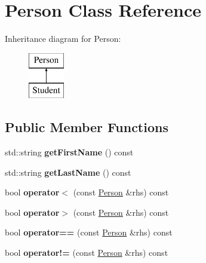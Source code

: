 \hypertarget{class_person}{}\section{Person Class Reference}
\label{class_person}
Inheritance diagram for Person\+:\begin{figure}[H]
\begin{center}
\leavevmode
\includegraphics[height=2.000000cm]{class_person}
\end{center}
\end{figure}
\subsection*{Public Member Functions}
\begin{DoxyCompactItemize}
\item 
\mbox{\label{class_person_a4a336bacf7dbe9b9227592d0896bcc1c}} 
std\+::string {\bfseries get\+First\+Name} () const
\item 
\mbox{\label{class_person_a8e8962e308c9c513ff676fd0b30c4926}} 
std\+::string {\bfseries get\+Last\+Name} () const
\item 
\mbox{\label{class_person_a6c319332a01a8ebf7e9490c6d8ddb900}} 
bool {\bfseries operator$<$} (const \mbox{\hyperlink{class_person}{Person}} \&rhs) const
\item 
\mbox{\label{class_person_aa32b8c7ebc59d593caa5a9c4c2a6f321}} 
bool {\bfseries operator$>$} (const \mbox{\hyperlink{class_person}{Person}} \&rhs) const
\item 
\mbox{\label{class_person_a3a02b9de688c0c8101000d0bcae4e04d}} 
bool {\bfseries operator==} (const \mbox{\hyperlink{class_person}{Person}} \&rhs) const
\item 
\mbox{\label{class_person_a8a11b1d5373c14a4e301cfcf83eb824f}} 
bool {\bfseries operator!=} (const \mbox{\hyperlink{class_person}{Person}} \&rhs) const
\end{DoxyCompactItemize}
